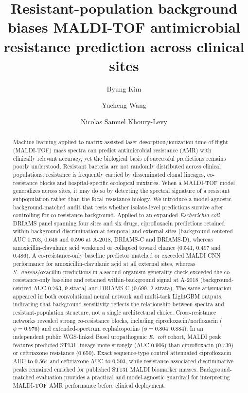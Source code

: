 \documentclass[11pt]{article}
\title{\bfseries Resistant-population background biases MALDI-TOF antimicrobial resistance prediction across clinical sites}
\author[1]{Byung Kim}
\author[2]{Yucheng Wang}
\author[3]{Nicolas Samuel Khoury-Levy}
\affil[1]{United States Air Force Academy, Colorado Springs, CO, USA}
\affil[2]{University of Wisconsin--Madison, Madison, WI, USA}
\affil[3]{Cornell University, Ithaca, NY, USA}
\date{}
\begin{document}
\maketitle

\begin{abstract}
Machine learning applied to matrix-assisted laser desorption/ionization time-of-flight (MALDI-TOF) mass spectra can predict antimicrobial resistance (AMR) with clinically relevant accuracy, yet the biological basis of successful predictions remains poorly understood. Resistant bacteria are not randomly distributed across clinical populations: resistance is frequently carried by disseminated clonal lineages, co-resistance blocks and hospital-specific ecological mixtures. When a MALDI-TOF model generalizes across sites, it may do so by detecting the spectral signature of a resistant subpopulation rather than the focal resistance biology. We introduce a model-agnostic background-matched audit that tests whether isolate-level predictions survive after controlling for co-resistance background. Applied to an expanded \textit{Escherichia coli} DRIAMS panel spanning four sites and six drugs, ciprofloxacin predictions retained within-background discrimination at temporal and external sites (background-centered AUC 0.703, 0.646 and 0.596 at A-2018, DRIAMS-C and DRIAMS-D), whereas amoxicillin-clavulanic acid weakened or collapsed toward chance (0.541, 0.497 and 0.486). A co-resistance-only baseline predictor matched or exceeded MALDI CNN performance for amoxicillin-clavulanic acid at all external sites, whereas \textit{S.~aureus}/oxacillin predictions in a second-organism generality check exceeded the co-resistance-only baseline and retained within-background signal at A-2018 (background-centred AUC 0.763, 9 strata) and DRIAMS-C (0.699, 2 strata). The same attenuation appeared in both convolutional neural network and multi-task LightGBM outputs, indicating that background sensitivity reflects the relationship between spectra and resistant-population structure, not a single architectural choice. Cross-resistance networks revealed strong co-resistance blocks, including ciprofloxacin/norfloxacin ($\phi = 0.976$) and extended-spectrum cephalosporins ($\phi = 0.804$--$0.884$). In an independent public WGS-linked Basel uropathogenic \textit{E.~coli} cohort, MALDI peak features predicted ST131 lineage more strongly (AUC 0.906) than ciprofloxacin (0.739) or ceftriaxone resistance (0.650). Exact sequence-type control attenuated ciprofloxacin AUC to 0.564 and ceftriaxone AUC to 0.503, while resistance-associated discriminative peaks remained enriched for published ST131 MALDI biomarker masses. Background-matched evaluation provides a practical and model-agnostic guardrail for interpreting MALDI-TOF AMR performance before clinical deployment.
\end{abstract}
\end{document}
